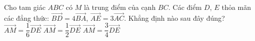 \begin{ex}%
	Cho tam giác $ABC$ có $M$ là trung điểm của cạnh $BC$. Các điểm $D$, $E$ thỏa mãn các đẳng thức: $\overrightarrow{BD}=4\overrightarrow{BA}$, $\overrightarrow{AE}=3\overrightarrow{AC}$. Khẳng định nào sau đây đúng?
	{\True$\overrightarrow{AM}=\dfrac{1}{6}\overrightarrow{DE}$}
	{$\overrightarrow{AM}=\dfrac{1}{2}\overrightarrow{DE}$}
	{$\overrightarrow{AM}=\dfrac{3}{4}\overrightarrow{DE}$}
\end{ex}
